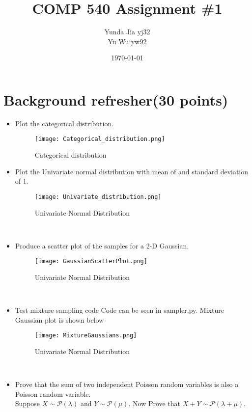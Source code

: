 \documentclass{article}
\title{COMP 540 Assignment \#1}
\author{Yunda Jia yj32\\Yu Wu yw92}
\date{\today}
\begin{document}
\maketitle

\section{Background refresher(30 points)}
\begin{itemize}
	\item Plot the categorical distribution.\\
\begin{figure}[htbp]
	\centering
	\texttt{[image: Categorical\_distribution.png]}
	\caption{Categorical distribution}
\end{figure}

\item Plot the Univariate normal distribution with mean of and standard deviation of 1.\\
\begin{figure}[htbp]
	\centering
	\texttt{[image: Univariate\_distribution.png]}
	\caption{Univariate Normal Distribution}
\end{figure}\\
\pagebreak
\item Produce a scatter plot of the samples for a 2-D Gaussian.\\
\begin{figure}[htbp]
	\centering
	\texttt{[image: GaussianScatterPlot.png]}
	\caption{Univariate Normal Distribution}
\end{figure}\\

\item Test mixture sampling code
Code can be seen in sampler.py. Mixture Gaussian plot is shown below\\
\begin{figure}[htbp]
	\centering
	\texttt{[image: MixtureGaussians.png]}
	\caption{Univariate Normal Distribution}
\end{figure}\\
\item Prove that the sum of two independent Poisson random variables is also a Poisson random variable.\\
Suppose $X \sim \mathcal{P}(\lambda)$ and $Y \sim \mathcal {P}(\mu)$. Now Prove that $X + Y \sim \mathcal{P}(\lambda + \mu)$.\\


\end{itemize}
\end{document}
